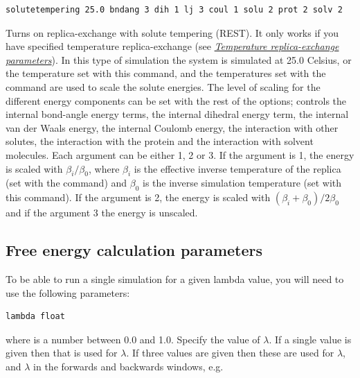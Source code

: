 \documentclass[letterpaper,10pt,english]{sphinxmanual}
\begin{document}
\begin{Verbatim}[commandchars=\\\{\}]
solutetempering 25.0 bndang 3 dih 1 lj 3 coul 1 solu 2 prot 2 solv 2
\end{Verbatim}

Turns on replica-exchange with solute tempering (REST). It only works if you have specified temperature replica-exchange (see {\hyperref[protoms:temperature-replica-exchange-parameters]{\emph{Temperature replica-exchange parameters}}}). In this type of simulation the system is simulated at 25.0 Celsius, or the temperature set with this command, and the temperatures set with the  command are used to scale the solute energies. The level of scaling for the different energy components can be set with the rest of the options;  controls the internal bond-angle energy terms,  the internal dihedral energy term,  the internal van der Waals energy,  the internal Coulomb energy,  the interaction with other solutes,  the interaction with the protein and  the interaction with solvent molecules. Each argument can be either 1, 2 or 3. If the argument is 1, the energy is scaled with \(\beta_i/\beta_0\), where \(\beta_i\) is the effective inverse temperature of the replica (set with the  command) and \(\beta_0\) is the inverse simulation temperature (set with this command). If the argument is 2, the energy is scaled with \((\beta_i+\beta_0)/2\beta_0\) and if the argument 3 the energy is unscaled.


\subsection{Free energy calculation parameters}
\label{protoms:free-energy-calculation-parameters}
To be able to run a single simulation for a given lambda value, you will need to use the following parameters:

\begin{Verbatim}[commandchars=\\\{\}]
lambda float
\end{Verbatim}

where  is a number between 0.0 and 1.0. Specify the value of \(\lambda\). If a single value is given then that is used for \(\lambda\). If three values are given then these are used for \(\lambda\), and \(\lambda\) in the forwards and backwards windows, e.g.
\end{document}

